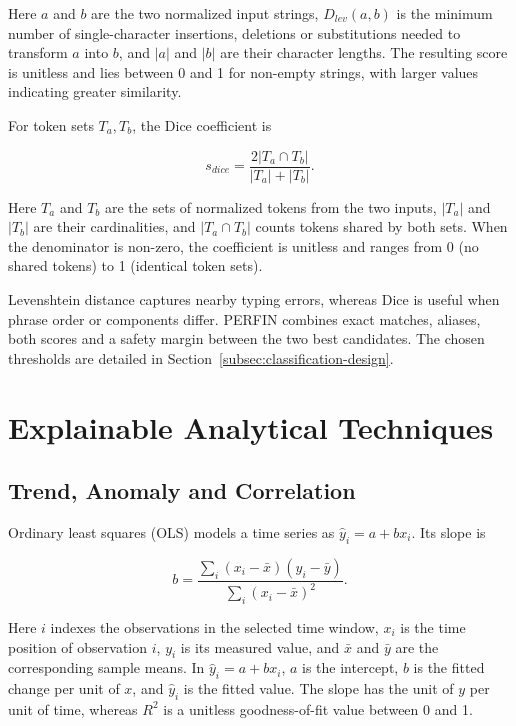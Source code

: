 Here $a$ and $b$ are the two normalized input strings, $D_{lev}(a,b)$ is the minimum number of single-character insertions, deletions or substitutions needed to transform $a$ into $b$, and $|a|$ and $|b|$ are their character lengths. The resulting score is unitless and lies between 0 and 1 for non-empty strings, with larger values indicating greater similarity.

For token sets $T_a,T_b$, the Dice coefficient \cite{dice1945} is

\begin{equation}
  s_{dice}=\frac{2|T_a\cap T_b|}{|T_a|+|T_b|}.
\end{equation}

Here $T_a$ and $T_b$ are the sets of normalized tokens from the two inputs, $|T_a|$ and $|T_b|$ are their cardinalities, and $|T_a\cap T_b|$ counts tokens shared by both sets. When the denominator is non-zero, the coefficient is unitless and ranges from 0 (no shared tokens) to 1 (identical token sets).

Levenshtein distance captures nearby typing errors, whereas Dice is useful when phrase order or components differ. PERFIN combines exact matches, aliases, both scores and a safety margin between the two best candidates. The chosen thresholds are detailed in Section~\ref{subsec:classification-design}.

\section{Explainable Analytical Techniques}
\label{sec:algorithms}

\subsection{Trend, Anomaly and Correlation}

Ordinary least squares (OLS) \cite{montgomery2012} models a time series as $\hat y_i=a+bx_i$. Its slope is

\begin{equation}
  b=\frac{\sum_i(x_i-\bar{x})(y_i-\bar{y})}
          {\sum_i(x_i-\bar{x})^2}.
\end{equation}

Here $i$ indexes the observations in the selected time window, $x_i$ is the time position of observation $i$, $y_i$ is its measured value, and $\bar{x}$ and $\bar{y}$ are the corresponding sample means. In $\hat y_i=a+bx_i$, $a$ is the intercept, $b$ is the fitted change per unit of $x$, and $\hat y_i$ is the fitted value. The slope has the unit of $y$ per unit of time, whereas $R^2$ is a unitless goodness-of-fit value between 0 and 1.

